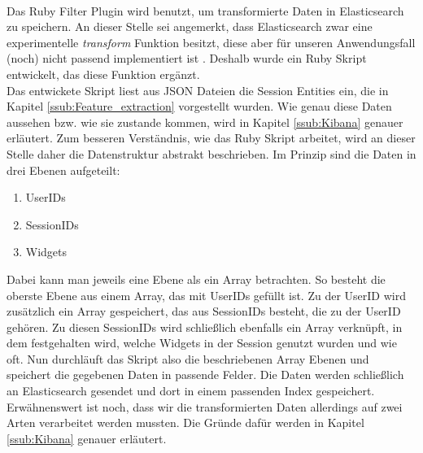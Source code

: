 \\
Das Ruby Filter Plugin wird benutzt, um transformierte Daten in Elasticsearch zu speichern. An dieser Stelle sei angemerkt, dass Elasticsearch zwar eine experimentelle \textit{transform} Funktion besitzt, diese aber für unseren Anwendungsfall (noch) nicht passend implementiert ist \citep{ElTr20}. Deshalb wurde ein Ruby Skript entwickelt, das diese Funktion ergänzt.\\
Das entwickete Skript liest aus JSON Dateien die Session Entities ein, die in Kapitel \ref{ssub:Feature_extraction} vorgestellt wurden. Wie genau diese Daten aussehen bzw. wie sie zustande kommen, wird in Kapitel \ref{ssub:Kibana} genauer erläutert. Zum besseren Verständnis, wie das Ruby Skript arbeitet, wird an dieser Stelle daher die Datenstruktur abstrakt beschrieben.
Im Prinzip sind die Daten in drei Ebenen aufgeteilt:\\
\begin{enumerate}
	\item UserIDs
	\item SessionIDs
	\item Widgets
\end{enumerate}
Dabei kann man jeweils eine Ebene als ein Array betrachten. So besteht die oberste Ebene aus einem Array, das mit UserIDs gefüllt ist. Zu der UserID wird zusätzlich ein Array gespeichert, das aus SessionIDs besteht, die zu der UserID gehören. Zu diesen SessionIDs wird schließlich ebenfalls ein Array verknüpft, in dem festgehalten wird, welche Widgets in der Session genutzt wurden und wie oft. Nun durchläuft das Skript also die beschriebenen Array Ebenen und speichert die gegebenen Daten in passende Felder. Die Daten werden schließlich an Elasticsearch gesendet und dort in einem passenden Index gespeichert.\\
Erwähnenswert ist noch, dass wir die transformierten Daten allerdings auf zwei Arten verarbeitet werden mussten. Die Gründe dafür werden in Kapitel \ref{ssub:Kibana} genauer erläutert.

